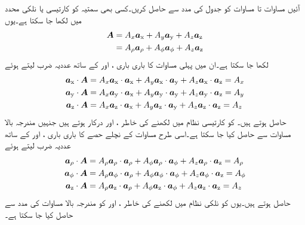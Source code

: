 آئیں مساوات  تا مساوات  کو جدول  کی مدد سے حاصل کریں۔کسی بھی سمتیہ  کو کارتیسی یا نلکی محدد میں لکھا جا سکتا ہے۔یوں
\begin{gather}
\begin{aligned}\label{مساوات_سمتیہ_سمتیہ_نلکی_کارتیسی_اشکال}
\kvec{A}&=A_x \ax+A_y \ay+A_z\az\\
&=A_\rho \arho+A_\phi \aphi+A_z \az
\end{aligned}
\end{gather}
لکھا جا سکتا ہے۔ان میں پہلی مساوات کا باری باری ،  اور  کے ساتھ عددیہ ضرب لیتے ہوئے 
\begin{gather}
\begin{aligned}\label{مساوات_سمتیہ_کارتیسی_اجزاء}
\ax \cdot \kvec{A}&=A_x \ax \cdot \ax+A_y \ax \cdot \ay+A_z \ax \cdot \az=A_x\\
\ay \cdot \kvec{A}&=A_x \ay \cdot \ax+A_y \ay \cdot \ay+A_z \ay \cdot \az=A_y\\
\az \cdot \kvec{A}&=A_x \az \cdot \ax+A_y \az \cdot \ay+A_z \az \cdot \az=A_z
\end{aligned}
\end{gather}
حاصل ہوتے ہیں۔ کو کارتیسی نظام میں لکھنے کی خاطر ،  اور  درکار ہوتے ہیں جنہیں مندرجہ بالا مساوات سے حاصل کیا جا سکتا ہے۔اسی طرح مساوات  کے نچلے حصے کا باری باری ،  اور  کے ساتھ عددیہ ضرب لیتے ہوئے
\begin{gather}
\begin{aligned}\label{مساوات_سمتیہ_نلکی_اجزاء}
\arho \cdot \kvec{A}&=A_\rho \arho \cdot \arho +A_\phi \arho \cdot \aphi +A_z \arho \cdot \az=A_\rho\\
\aphi \cdot \kvec{A}&=A_\rho \aphi \cdot \arho +A_\phi \aphi \cdot \aphi +A_z \aphi \cdot \az=A_\phi \\
\az \cdot \kvec{A}&=A_\rho \az \cdot \arho +A_\phi \az \cdot \aphi +A_z \az \cdot \az=A_z
\end{aligned}
\end{gather}
حاصل ہوتے ہیں۔یوں  کو نلکی نظام میں لکھنے کی خاطر ،  اور  کو مندرجہ بالا مساوات کی مدد سے حاصل کیا جا سکتا ہے۔

